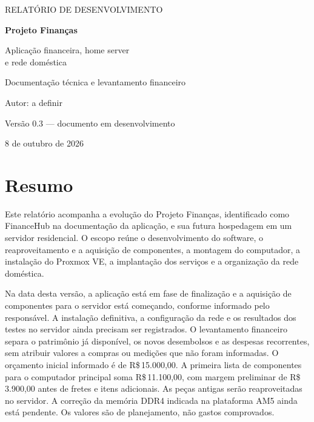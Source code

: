 \documentclass[11pt,a4paper,oneside]{report}
\newcommand{\dinheiro}[1]{R\$\,#1}
\newcommand{\versaorelatorio}{0.3}
\newcommand{\datarelatorio}{8 de outubro de 2026}
\newcommand{\autorrelatorio}{Autor: a definir}
\begin{document}
\begin{titlepage}
\centering
\vspace*{2cm}
{\Large RELATÓRIO DE DESENVOLVIMENTO\par}
\vspace{1.2cm}
{\Huge\bfseries\color{accent} Projeto Finanças\par}
\vspace{0.7cm}
{\Large Aplicação financeira, home server\\e rede doméstica\par}
\vspace{1.5cm}
{\large Documentação técnica e levantamento financeiro\par}
\vfill
{\large \autorrelatorio\par}
\vspace{0.5cm}
Versão \versaorelatorio{} --- documento em desenvolvimento\par
\datarelatorio\par
\end{titlepage}

\chapter*{Resumo}
Este relatório acompanha a evolução do Projeto Finanças, identificado como
FinanceHub na documentação da aplicação, e sua futura hospedagem em um servidor
residencial. O escopo reúne o desenvolvimento do software, o reaproveitamento e a
aquisição de componentes, a montagem do computador, a instalação do Proxmox VE,
a implantação dos serviços
e a organização da rede doméstica.

Na data desta versão, a aplicação está em fase de finalização e a aquisição de
componentes para o servidor está começando, conforme informado pelo responsável.
A instalação definitiva, a configuração da rede e os resultados dos testes no
servidor ainda precisam ser registrados. O levantamento financeiro separa o
patrimônio já disponível, os novos desembolsos e as despesas recorrentes, sem
atribuir valores a compras ou medições que não foram informadas.
O orçamento inicial informado é de \dinheiro{15.000,00}. A primeira lista de
componentes para o computador principal soma \dinheiro{11.100,00}, com margem
preliminar de \dinheiro{3.900,00} antes de fretes e itens adicionais.
As peças antigas serão reaproveitadas no servidor. A correção da memória DDR4
indicada na plataforma AM5 ainda está pendente.
Os valores são de planejamento, não gastos comprovados.
\end{document}
